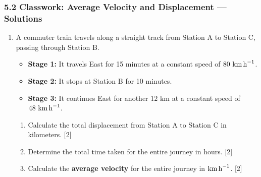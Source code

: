 \documentclass[12pt, twoside]{article}
\begin{document}
\subsubsection*{5.2 Classwork: Average Velocity and Displacement --- Solutions}

\begin{enumerate}[itemsep=0.15cm]

\item A commuter train travels along a straight track from Station A to Station C, passing through Station B.
\begin{itemize}[itemsep=0.1cm]
  \item \textbf{Stage 1:} It travels East for 15 minutes at a constant speed of $80 \text{ km\,h}^{-1}$.
  \item \textbf{Stage 2:} It stops at Station B for 10 minutes.
  \item \textbf{Stage 3:} It continues East for another $12 \text{ km}$ at a constant speed of $48 \text{ km\,h}^{-1}$.
\end{itemize}
\begin{enumerate}[itemsep=0.1cm]
  \item Calculate the total displacement from Station A to Station C in kilometers. \hfill [2]
  \item Determine the total time taken for the entire journey in hours. \hfill [2]
  \item Calculate the \textbf{average velocity} for the entire journey in $\text{km\,h}^{-1}$. \hfill [2]
\end{enumerate}

\vfill



\end{enumerate}
\end{document}
